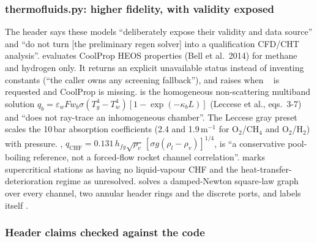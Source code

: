 \subsubsection*{thermofluids.py: higher fidelity, with validity exposed}

The header says these models ``deliberately expose their validity and data source'' and ``do not turn [the preliminary regen solver] into a qualification CFD/CHT analysis''.  evaluates CoolProp HEOS properties (Bell et al.\ 2014) for methane and hydrogen only. It returns an explicit unavailable status instead of inventing constants (``the caller owns any screening fallback''), and  raises when ~ is requested and CoolProp is missing.  is the homogeneous non-scattering multiband solution $q_b = \varepsilon_wFw_b\sigma(T_g^4-T_w^4)[1-\exp(-\kappa_bL)]$ (Leccese et al., eqs.\ 3-7) and ``does not ray-trace an inhomogeneous chamber''. The Leccese gray preset scales the 10\,bar absorption coefficients (2.4 and 1.9\,m$^{-1}$ for O$_2$/CH$_4$ and O$_2$/H$_2$) with pressure. , $q_{\mathrm{CHF}} = 0.131\,h_{fg}\sqrt{\rho_v}\,[\sigma g(\rho_l-\rho_v)]^{1/4}$, is ``a conservative pool-boiling reference, not a forced-flow rocket channel correlation''.  marks supercritical stations as having no liquid-vapour CHF and the heat-transfer-deterioration regime as unresolved.  solves a damped-Newton square-law graph over every channel, two annular header rings and the discrete ports, and labels itself .

\subsubsection*{Header claims checked against the code}

